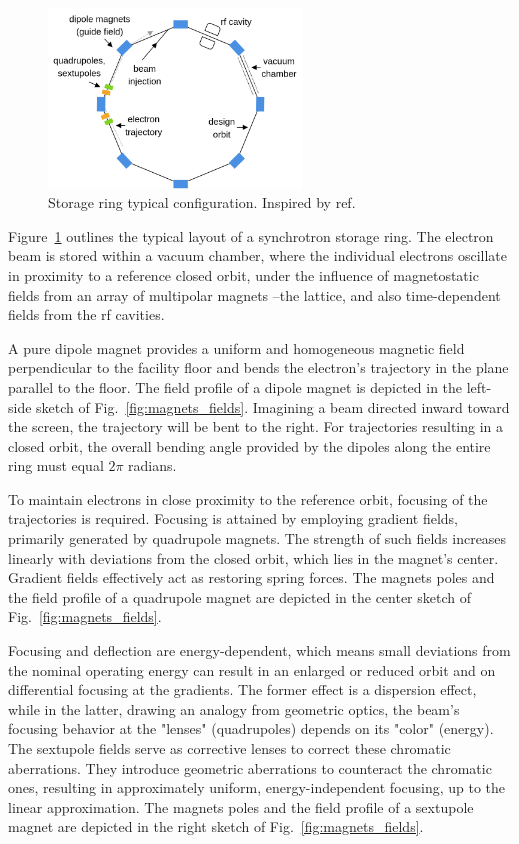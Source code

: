 \begin{figure}[tb]
    \centering
    \includegraphics[width=0.6\textwidth]{Images/storage_ring.png}
    \caption[Storage ring typical configuration.]{Storage ring typical configuration. Inspired by ref.~\cite{sands_physics_1969}}
    \label{fig:storage_ring}
\end{figure}
Figure~\ref{fig:storage_ring} outlines the typical layout of a synchrotron storage ring. The electron beam is stored within a vacuum chamber, where the individual electrons oscillate in proximity to a reference closed orbit, under the influence of magnetostatic fields from an array of multipolar magnets --the lattice, and also time-dependent fields from the \gls*{rf} cavities.

A pure dipole magnet provides a uniform and homogeneous magnetic field perpendicular to the facility floor and bends the electron's trajectory in the plane parallel to the floor. The field profile of a dipole magnet is depicted in the left-side sketch of Fig.~\ref{fig:magnets_fields}. Imagining a beam directed inward toward the screen, the trajectory will be bent to the right. For trajectories resulting in a closed orbit, the overall bending angle provided by the dipoles along the entire ring must equal $2\pi$ radians.

To maintain electrons in close proximity to the reference orbit, focusing of the trajectories is required. Focusing is attained by employing gradient fields, primarily generated by quadrupole magnets. The strength of such fields increases linearly with deviations from the closed orbit, which lies in the magnet's center. Gradient fields effectively act as restoring spring forces. The magnets poles and the field profile of a quadrupole magnet are depicted in the center sketch of Fig.~\ref{fig:magnets_fields}.

Focusing and deflection are energy-dependent, which means small deviations from the nominal operating energy can result in an enlarged or reduced orbit and on differential focusing at the gradients. The former effect is a dispersion effect, while in the latter, drawing an analogy from geometric optics, the beam's focusing behavior at the "lenses" (quadrupoles) depends on its "color" (energy). The sextupole fields serve as corrective lenses to correct these chromatic aberrations. They introduce geometric aberrations to counteract the chromatic ones, resulting in approximately uniform, energy-independent focusing, up to the linear approximation. The magnets poles and the field profile of a sextupole magnet are depicted in the right sketch of Fig.~\ref{fig:magnets_fields}.

